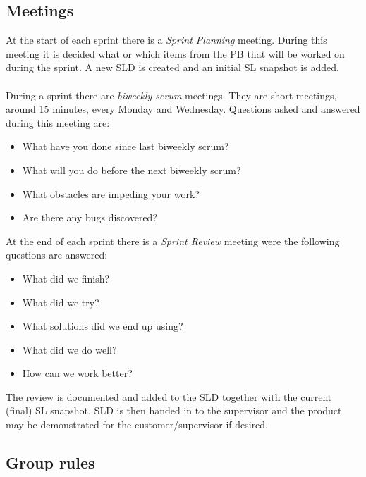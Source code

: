 \newpage
\subsection{Meetings}
At the start of each sprint there is a \emph{Sprint Planning} meeting. During this meeting it is decided what or which items from the PB that will be worked on during the sprint. A new SLD is created and an initial SL snapshot is added.\\
\\
During a sprint there are \emph{biweekly scrum} meetings. They are short meetings, around 15 minutes, every Monday and Wednesday. Questions asked and answered during this meeting are:
\begin{itemize}
  \item What have you done since last biweekly scrum?
  \item What will you do before the next biweekly scrum?
  \item What obstacles are impeding your work?
  \item Are there any bugs discovered?
\end{itemize}
\vspace{4mm}
At the end of each sprint there is a \emph{Sprint Review} meeting were the following questions are answered:
\begin{itemize}
  \item What did we finish? 
  \item What did we try?
  \item What solutions did we end up using?
  \item What did we do well?
  \item How can we work better?
\end{itemize}
The review is documented and added to the SLD together with the current (final) SL snapshot. SLD is then handed in to the supervisor and the product may be demonstrated for the customer/supervisor if desired.

\subsection{Group rules}
